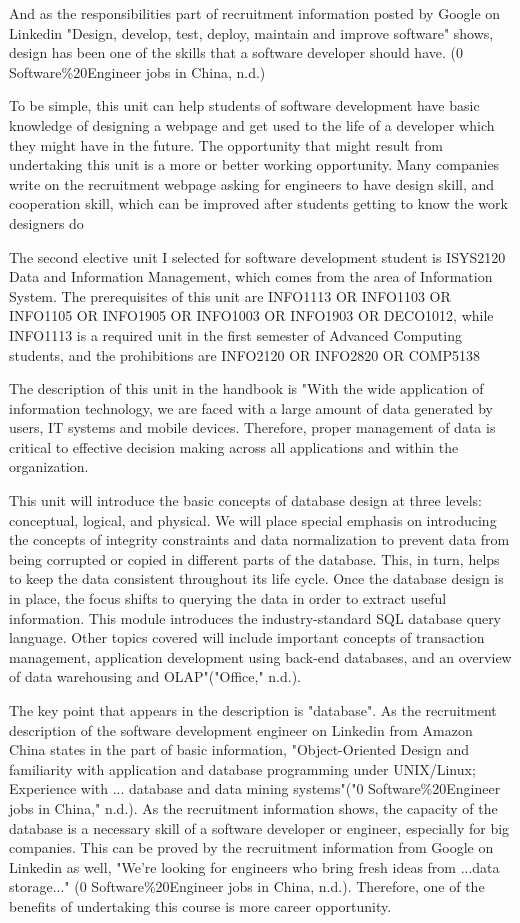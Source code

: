 \documentclass[12pt]{article}
\begin{document}
And as the responsibilities part of recruitment information posted by Google on Linkedin "Design, develop, test, deploy, maintain and improve software" shows, design has been one of the skills that a software developer should have. (0 Software\%20Engineer jobs in China, n.d.)

To be simple, this unit can help students of software development have basic knowledge of designing a webpage and get used to the life of a developer which they might have in the future.
The opportunity that might result from undertaking this unit is a more or better working opportunity. Many companies write on the recruitment webpage asking for engineers to have design skill, and cooperation skill, which can be improved after students getting to know the work designers do

The second elective unit I selected for software development student is ISYS2120 Data and Information Management, which comes from the area of Information System. The prerequisites of this unit are INFO1113 OR INFO1103 OR INFO1105 OR INFO1905 OR INFO1003 OR INFO1903 OR DECO1012, while INFO1113 is a required unit in the first semester of Advanced Computing students, and the prohibitions are INFO2120 OR INFO2820 OR COMP5138

The description of this unit in the handbook is "With the wide application of information technology, we are faced with a large amount of data generated by users, IT systems and mobile devices. Therefore, proper management of data is critical to effective decision making across all applications and within the organization.

This unit will introduce the basic concepts of database design at three levels: conceptual, logical, and physical. We will place special emphasis on introducing the concepts of integrity constraints and data normalization to prevent data from being corrupted or copied in different parts of the database. This, in turn, helps to keep the data consistent throughout its life cycle. Once the database design is in place, the focus shifts to querying the data in order to extract useful information. This module introduces the industry-standard SQL database query language. Other topics covered will include important concepts of transaction management, application development using back-end databases, and an overview of data warehousing and OLAP"("Office," n.d.).

The key point that appears in the description is "database". As the recruitment description of the software development engineer on Linkedin from Amazon China states in the part of basic information, "Object-Oriented Design and familiarity with application and database programming under UNIX/Linux; Experience with ... database and data mining systems"("0 Software\%20Engineer jobs in China," n.d.). As the recruitment information shows, the capacity of the database is a necessary skill of a software developer or engineer, especially for big companies. This can be proved by the recruitment information from Google on Linkedin as well, "We're looking for engineers who bring fresh ideas from ...data storage..." (0 Software\%20Engineer jobs in China, n.d.). Therefore, one of the benefits of undertaking this course is more career opportunity.
\end{document}
